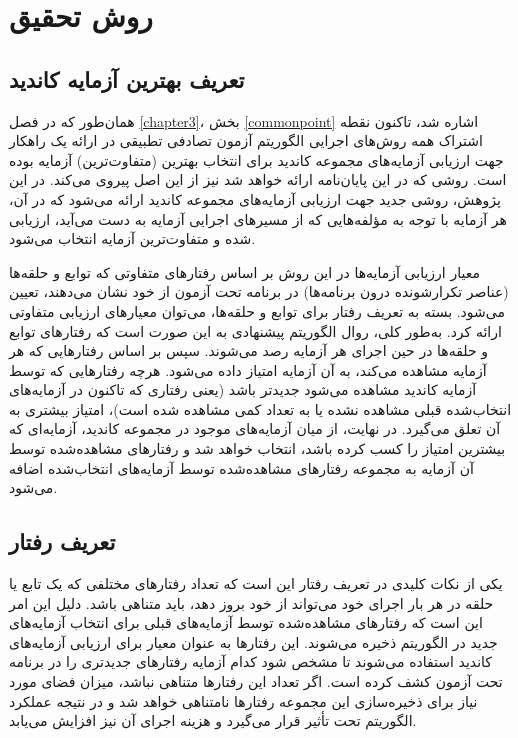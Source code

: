 \chapter{روش تحقیق}\label{chapter4}

\section{تعریف بهترین آزمایه کاندید}

همان‌طور که در فصل \ref{chapter3}، بخش \ref{commonpoint} اشاره شد، تاکنون نقطه اشتراک همه روش‌های اجرایی الگوریتم آزمون تصادفی تطبیقی در ارائه یک راهکار جهت ارزیابی آزمایه‌های مجموعه کاندید برای انتخاب بهترین (متفاوت‌ترین) آزمایه بوده است. روشی که در این پایان‌نامه ارائه خواهد شد نیز از این اصل پیروی می‌کند. در این پژوهش، روشی جدید جهت ارزیابی آزمایه‌های مجموعه کاندید ارائه می‌شود که در آن، هر آزمایه با توجه به مؤلفه‌هایی که از مسیرهای اجرایی آزمایه به دست می‌آید، ارزیابی شده و متفاوت‌ترین آزمایه انتخاب می‌شود.

معیار ارزیابی آزمایه‌ها در این روش بر اساس رفتارهای متفاوتی که توابع و حلقه‌ها (عناصر تکرارشونده درون برنامه‌ها) در برنامه تحت آزمون از خود نشان می‌دهند، تعیین می‌شود. بسته به تعریف رفتار برای توابع و حلقه‌ها، می‌توان معیارهای ارزیابی متفاوتی ارائه کرد. به‌طور کلی، روال الگوریتم پیشنهادی به این صورت است که رفتارهای توابع و حلقه‌ها در حین اجرای هر آزمایه رصد می‌شوند. سپس بر اساس رفتارهایی که هر آزمایه مشاهده می‌کند، به آن آزمایه امتیاز داده می‌شود. هرچه رفتارهایی که توسط آزمایه کاندید مشاهده می‌شود جدیدتر باشد (یعنی رفتاری که تاکنون در آزمایه‌های انتخاب‌شده قبلی مشاهده نشده یا به تعداد کمی مشاهده شده است)، امتیاز بیشتری به آن تعلق می‌گیرد. در نهایت، از میان آزمایه‌های موجود در مجموعه کاندید، آزمایه‌ای که بیشترین امتیاز را کسب کرده باشد، انتخاب خواهد شد و رفتارهای مشاهده‌شده توسط آن آزمایه به مجموعه رفتارهای مشاهده‌شده توسط آزمایه‌های انتخاب‌شده اضافه می‌شود.

\section{تعریف رفتار}

یکی از نکات کلیدی در تعریف رفتار این است که تعداد رفتارهای مختلفی که یک تابع یا حلقه در هر بار اجرای خود می‌تواند از خود بروز دهد، باید متناهی باشد. دلیل این امر این است که رفتارهای مشاهده‌شده توسط آزمایه‌های قبلی برای انتخاب آزمایه‌های جدید در الگوریتم ذخیره می‌شوند. این رفتارها به عنوان معیار برای ارزیابی آزمایه‌های کاندید استفاده می‌شوند تا مشخص شود کدام آزمایه رفتارهای جدیدتری را در برنامه تحت آزمون کشف کرده است. اگر تعداد این رفتارها متناهی نباشد، میزان فضای مورد نیاز برای ذخیره‌سازی این مجموعه رفتارها نامتناهی خواهد شد و در نتیجه عملکرد الگوریتم تحت تأثیر قرار می‌گیرد و هزینه اجرای آن نیز افزایش می‌یابد.

